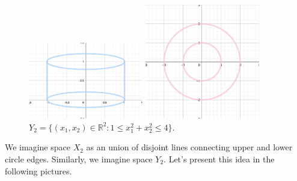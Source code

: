 \documentclass[a4paper,11pt]{article}
\begin{document}
\begin{figure}[ht!]
     \begin{minipage}{0.45\textwidth}
         \centering
         \includegraphics[width=50mm]{X_n2.png}
         \caption{$X_2 = S^1 \times [0,1] \subset \mathbb{R}^3$.}
       \end{minipage}\hfill
     \begin{minipage}{0.55\textwidth}
         \centering
         \includegraphics[width=50mm]{Y_n2.png}
         \caption{$ Y_2 = \{ (x_1, x_2) \in \mathbb{R}^2 : 1 \leq x_1^2 + x_2^2 \leq 4 \}$.}
       \end{minipage}\hfill
    \end{figure}

\newpage
\noindent
We imagine space $X_2$ as an union of disjoint lines connecting upper and lower circle edges. Similarly, we imagine space $Y_2$. Let's present this idea in the following pictures.
\end{document}
